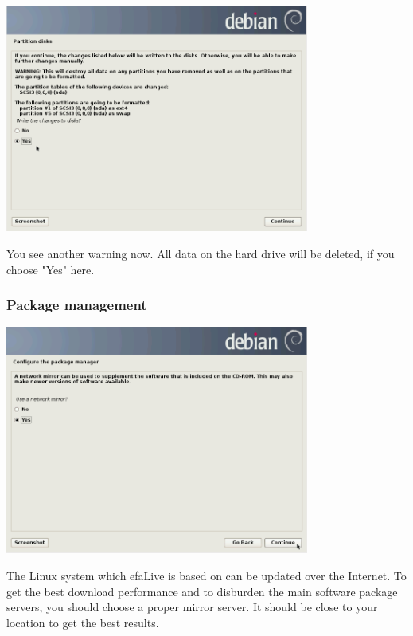 \documentclass[a4paper,12pt,twoside]{article}
\begin{document}
\bigskip
\begin{minipage}{\linewidth}
    \centering
    \includegraphics[width=10cm]{efaLiveen-img/efaLiveen-img13.png}
    \label{fig:conf_write_hdd}
\end{minipage}
\bigskip

You see another warning now. All data on the hard drive will be deleted,
if you choose "Yes" here.


\subsubsection{Package management}
\label{sct:package_management}

\bigskip
\begin{minipage}{\linewidth}
    \centering
    \includegraphics[width=10cm]{efaLiveen-img/efaLiveen-img14.png}
    \label{fig:use_mirror}
\end{minipage}
\bigskip

The Linux system which efaLive is based on can be updated over the
Internet. To get the best download performance and to disburden the
main software package servers, you should choose a proper mirror
server. It should be close to your location to get the best results.
\end{document}
